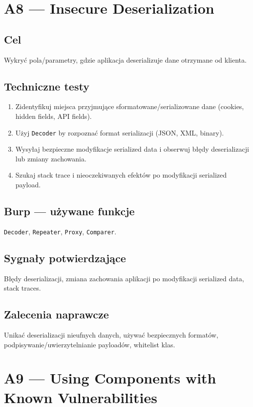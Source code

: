 \documentclass[11pt,a4paper]{article}
\begin{document}
	\newpage
	\section{A8 --- Insecure Deserialization}
	\subsection*{Cel}
	Wykryć pola/parametry, gdzie aplikacja deserializuje dane otrzymane od klienta.
	
	\subsection*{Techniczne testy}
	\begin{enumerate}[leftmargin=*,label=\arabic*)]
		\item Zidentyfikuj miejsca przyjmujące sformatowane/serializowane dane (cookies, hidden fields, API fields).
		\item Użyj \texttt{Decoder} by rozpoznać format serializacji (JSON, XML, binary).
		\item Wysyłaj bezpieczne modyfikacje serialized data i obserwuj błędy deserializacji lub zmiany zachowania.
		\item Szukaj stack trace i nieoczekiwanych efektów po modyfikacji serialized payload.
	\end{enumerate}
	
	\subsection*{Burp --- używane funkcje}
	\texttt{Decoder}, \texttt{Repeater}, \texttt{Proxy}, \texttt{Comparer}.
	
	\subsection*{Sygnały potwierdzające}
	Błędy deserializacji, zmiana zachowania aplikacji po modyfikacji serialized data, stack traces.
	
	\subsection*{Zalecenia naprawcze}
	Unikać deserializacji nieufnych danych, używać bezpiecznych formatów, podpisywanie/uwierzytelnianie payloadów, whitelist klas.
	
	\newpage
	\section{A9 --- Using Components with Known Vulnerabilities}
\end{document}
